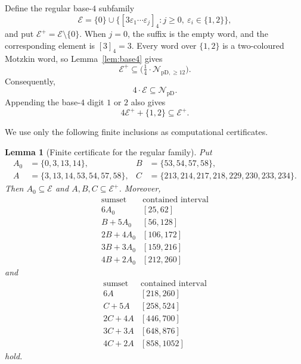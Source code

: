 \documentclass[12pt]{article}
\theoremstyle{plain}
\newtheorem{lemma}[theorem]{Lemma}
\theoremstyle{definition}
\theoremstyle{plain}
\newcommand{\NpD}{\mathcal{N}_{\mathrm{pD}}}
\newcommand{\Pset}{%
  \bigl(\tfrac{1}{4}\cdot\mathcal{N}_{\mathrm{pD},\geq 12}\bigr)%
}
\begin{document}
Define the regular base-$4$ subfamily
\[
 \mathcal E=\{0\}\cup
 \bigl\{[3\varepsilon_1\cdots\varepsilon_j]_4:
        j\geq0,\ \varepsilon_i\in\{1,2\}\bigr\},
\]
and put $\mathcal E^+=\mathcal E\setminus\{0\}$.  When $j=0$, the
suffix is the empty word, and the corresponding element is $[3]_4=3$.
Every word over $\{1,2\}$ is a two-coloured Motzkin word, so
Lemma~\ref{lem:base4} gives
\[
 \mathcal E^+\subseteq\Pset.
\]
Consequently,
\begin{equation}\label{eq:4E}
 4\cdot\mathcal E\subseteq\NpD.
\end{equation}
Appending the base-$4$ digit $1$ or $2$ also gives
\begin{equation}\label{eq:Eclosure}
 4\mathcal E^++\{1,2\}\subseteq\mathcal E^+.
\end{equation}

We use only the following finite inclusions as computational certificates.

\begin{lemma}[Finite certificate for the regular family]
\label{lem:Ecertificate}
Put
\[
\begin{aligned}
 A_0&=\{0,3,13,14\},
 &B&=\{53,54,57,58\},\\
 A&=\{3,13,14,53,54,57,58\},
 &C&=\{213,214,217,218,229,230,233,234\}.
\end{aligned}
\]
Then $A_0\subseteq\mathcal E$ and $A,B,C\subseteq\mathcal E^+$.
Moreover,
\begin{equation}\label{eq:E-small-certificate}
\begin{array}{c|c}
\text{sumset}&\text{contained interval}\\ \hline
6A_0 &[25,62]\\
B+5A_0 &[56,128]\\
2B+4A_0 &[106,172]\\
3B+3A_0 &[159,216]\\
4B+2A_0 &[212,260]
\end{array}
\end{equation}
and
\begin{equation}\label{eq:E-tail-certificate}
\begin{array}{c|c}
\text{sumset}&\text{contained interval}\\ \hline
6A &[218,260]\\
C+5A &[258,524]\\
2C+4A &[446,700]\\
3C+3A &[648,876]\\
4C+2A &[858,1052]
\end{array}
\end{equation}
hold.
\end{lemma}
\end{document}
